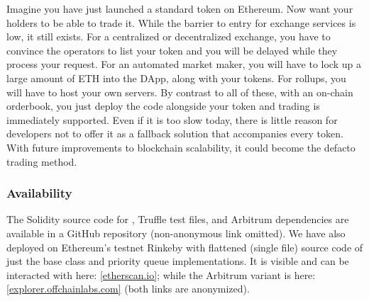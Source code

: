 Imagine you have just launched a standard token on Ethereum. Now want your holders to be able to trade it. While the barrier to entry for exchange services is low, it still exists. For a centralized or decentralized exchange, you have to convince the operators to list your token and you will be delayed while they process your request. For an automated market maker, you will have to lock up a large amount of ETH into the DApp, along with your tokens. For rollups, you will have to host your own servers. By contrast to all of these, with an on-chain orderbook, you just deploy the code alongside your token and trading is immediately supported. Even if it is too slow today, there is little reason for developers not to offer it as a fallback solution that accompanies every token. With future improvements to blockchain scalability, it could become the defacto trading method.
 

\subsubsection*{Availability} 
The Solidity source code for \cm, Truffle test files, and Arbitrum dependencies are available in a GitHub repository (non-anonymous link omitted). We have also deployed \cm on Ethereum's testnet Rinkeby with flattened (single file) source code of just the \cm base class and priority queue implementations. It is visible and can be interacted with here: \href{https://rinkeby.etherscan.io/address/0xffcaae2a77254b4cd72356b27377408ab31155b4}{[etherscan.io]}; while the Arbitrum variant is here: \href{https://explorer.offchainlabs.com/#/tx/0x500bee14a58d6d602a697cb858b78b5f071320a1d544c44fbea00048124b1ea8}{[explorer.offchainlabs.com]} (both links are anonymized).


























